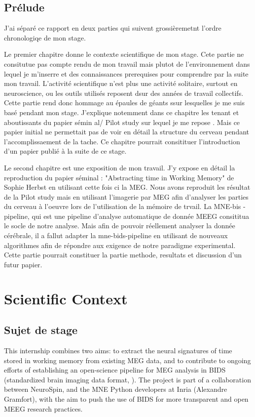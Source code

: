 \section{Prélude}

J'ai séparé ce rapport en deux parties qui suivent grossièremetnt l'ordre chronologiqe de mon stage.

Le premier chapitre donne le contexte scientifique de mon stage. Cete partie ne consitutue pas compte rendu de mon travail mais plutot de l'environnement dans lequel je m'inserre et des connaissances prerequises pour comprendre par la suite mon travail. L'activité scientifique n'est plus une activité solitaire, surtout en neuroscience, ou les outils utilisés reposent dsur des années de travail collectifs. Cette partie rend donc hommage au épaules de géants ssur lesquelles je me suis basé pendant mon stage. J'explique notemment dans ce chapitre les tenant et aboutissants du papier sémin al/ Pilot study sur lequel je me repose \cite{herbst2021abstracting}. Mais ce papier initial ne permettait pas de voir en détail la structure du cerveau pendant l'accomplissaement de la tache. Ce chapitre pourrait consitituer l'introduction d'un papier publié à la suite de ce stage.

Le second chapitre est une exposition de mon travail. J'y expose en détail la reproduction du papier séminal : "Abstracting time in Working Memory" de Sophie Herbst en utilisant cette fois ci la MEG. Nous avons reproduit les résultat de la Pilot study mais en utilisant l'imagerie par MEG afin d'analyser les parties du cerveau à l'oeuvre lors de l'utilisation de la mémoire de trvail. La MNE-bis -pipeline, qui est une pipeline d'analyse automatique de donnée MEEG consititua le socle de notre analyse. Mais afin de pouvoir réellement analyser la donnée cérébrale, il a fallut adapter la mne-bids-pipeline en utilisant de nouveaux algorithmes afin de répondre aux exigence de notre paradigme experimental. Cette partie pourrait constituer la partie methode, resultats et discussion d'un futur papier.


\chapter{Scientific Context}

\section{Sujet de stage}
This internship combines two aims: to extract the neural signatures of time stored
in working memory from existing MEG data, and to contribute to ongoing efforts of
establishing an open-science pipeline for MEG analysis in BIDS (standardized brain imaging
data format, \cite{gorgolewski2016brain}). The project is part of a collaboration between NeuroSpin, and the MNE
Python developers at Inria (Alexandre Gramfort), with the aim to push the use of BIDS for
more transparent and open MEEG research practices.

